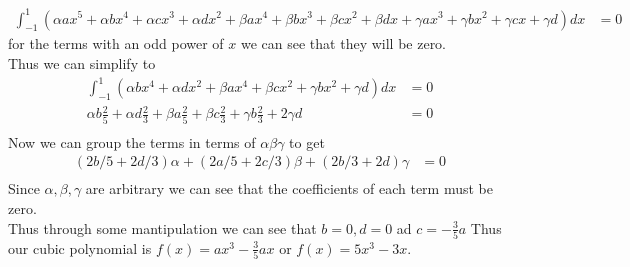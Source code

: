 \documentclass[answers,12pt,addpoints]{exam}
\begin{document}
\begin{questions}
\begin{solution}
\begin{align*}
            \int_{-1}^{1} (\alpha ax^5 + \alpha bx^4 + \alpha cx^3 + \alpha dx^2 + \beta ax^4 + \beta bx^3 + \beta cx^2 + \beta dx + \gamma ax^3 + \gamma bx^2 + \gamma cx + \gamma d ) dx &= 0
        \end{align*}
        for the terms with an odd power of $x$ we can see that they will be zero.\\
        Thus we can simplify to 
        \begin{align*}
            \int_{-1}^{1} (\alpha b x^4 + \alpha d x^2 + \beta a x^4 + \beta c x^2 + \gamma b x^2 + \gamma d )dx &= 0\\
            \alpha b \frac{2}{5} + \alpha d \frac{2}{3} + \beta a \frac{2}{5} + \beta c \frac{2}{3} + \gamma b \frac{2}{3} + 2\gamma d  &= 0\\
        \end{align*}
        Now we can group the terms in terms of $\alpha \beta \gamma$ to get 
        \begin{align*}
            (2b/5 + 2d/3)\alpha + (2a/5 + 2c/3)\beta + (2b/3 + 2d)\gamma &= 0\\
        \end{align*}
        Since $\alpha, \beta, \gamma$ are arbitrary we can see that the coefficients of each term must be zero.\\
        Thus through some mantipulation we can see that $b = 0, d=0$ ad $c = -\frac{3}{5}a$ 
        Thus our cubic polynomial is $f(x) = ax^3 - \frac{3}{5}a x$ or $f(x) = 5x^3 - 3x$.
    \end{solution}


\end{questions}
\end{document}
